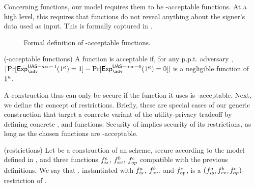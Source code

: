 Concerning \fissue functions, our \UAS model requires them to be \UAS-acceptable
functions.  At a high level, this requires that \fissue functions do not reveal
anything about the signer's data used as input. This is formally captured in
.

\begin{figure}[ht!]
  \centering  
  \label{fig:uas-acceptable}
  \caption{Formal definition of \UAS-acceptable \fissue functions.}
\end{figure}

\begin{definition}{(\UAS-acceptable \fissue functions)}
  \label{def:uas-acc-func}
  A \fissue function is \UAS acceptable if, for any p.p.t. adversary \adv,
  $|\Pr[\Exp^{\UAS-acc-1}_\adv(1^\secpar)=1]-\Pr[\Exp^{\UAS-acc-0}_\adv
  (1^\secpar)=0]|$ is a negligible function of $1^\kappa$.
\end{definition}

A \UAS construction thus can only be secure if the \fissue function it uses is
\UAS-acceptable.
%
Next, we define the concept of \CUASGen restrictions. Briefly, these are special
cases of our generic construction that target a concrete variant of the
utility-privacy tradeoff by defining concrete \fissue, \feval and \finsp
functions. Security of \CUASGen implies security of its restrictions, as long as
the chosen functions are \CUASGen-acceptable.

\begin{definition}{(\CUASGen restrictions)}
  \label{def:uas-restrictions}
  Let \CUASGen be a construction of an \UAS scheme, secure according to
  the model defined in , and three functions $f_{is}^a$,
  $f_{ev}^b$, $f_{op}^c$ compatible with the previous definitions. We say that
  \CUASGen, instantiated with $f_{is}^a$, $f_{ev}^b$, and $f_{op}^c$, is a
  $(f_{is}^a,f_{ev}^b,f_{op}^c)$-restriction of \CUASGen.
\end{definition}

